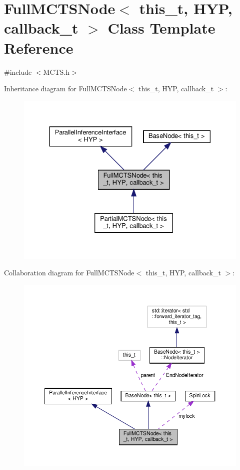 \hypertarget{class_full_m_c_t_s_node}{}\section{Full\+M\+C\+T\+S\+Node$<$ this\+\_\+t, H\+YP, callback\+\_\+t $>$ Class Template Reference}
\label{class_full_m_c_t_s_node}


{\ttfamily \#include $<$M\+C\+T\+S.\+h$>$}



Inheritance diagram for Full\+M\+C\+T\+S\+Node$<$ this\+\_\+t, H\+YP, callback\+\_\+t $>$\+:\nopagebreak
\begin{figure}[H]
\begin{center}
\leavevmode
\includegraphics[width=330pt]{class_full_m_c_t_s_node__inherit__graph}
\end{center}
\end{figure}


Collaboration diagram for Full\+M\+C\+T\+S\+Node$<$ this\+\_\+t, H\+YP, callback\+\_\+t $>$\+:
\nopagebreak
\begin{figure}[H]
\begin{center}
\leavevmode
\includegraphics[width=350pt]{class_full_m_c_t_s_node__coll__graph}
\end{center}
\end{figure}
